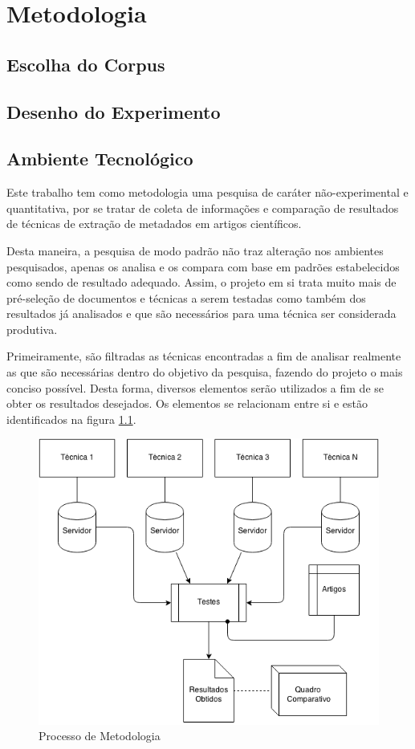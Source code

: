 \chapter{Metodologia}

\section{Escolha do Corpus}

\section{Desenho do Experimento}

\section{Ambiente Tecnológico}

Este trabalho tem como metodologia uma pesquisa de caráter não-experimental e quantitativa, por se tratar de coleta de informações e comparação de resultados de técnicas de extração de metadados em artigos científicos.

Desta maneira, a pesquisa de modo padrão não traz alteração nos ambientes pesquisados, apenas os analisa e os compara com base em padrões estabelecidos como sendo de resultado adequado. Assim, o projeto em si trata muito mais de pré-seleção de documentos e técnicas a serem testadas como também dos resultados já analisados e que são necessários para uma técnica ser considerada produtiva.


Primeiramente, são filtradas as técnicas encontradas a fim de analisar realmente as que são necessárias dentro do objetivo da pesquisa, fazendo do projeto o mais conciso possível. Desta forma, diversos elementos serão utilizados a fim de se obter os resultados desejados. Os elementos se relacionam entre si e estão identificados na figura \ref{fig:metodology}. 


\begin{figure}
\centering
\caption{Processo de Metodologia}
\label{fig:metodology}
\includegraphics[width=0.7\linewidth]{./assets/metodology}
\end{figure}


